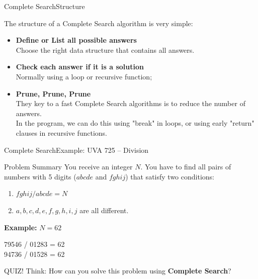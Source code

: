 \begin{frame}{Complete Search}{Structure}

  The structure of a Complete Search algorithm is very simple:
  \bigskip

  \begin{itemize}
    \item {\bf Define or List all possible answers}\\
    Choose the right data structure that contains all answers.
    \bigskip

  \item {\bf Check each answer if it is a solution}\\
    Normally using a loop or recursive function;
    \bigskip

  \item {\bf Prune, Prune, Prune}\\
    They key to a fast Complete Search algorithms is to reduce the number of answers.\\

    In the program, we can do this using "break" in loops, or using early "return" clauses in recursive functions.
  \end{itemize}

\end{frame}

\begin{frame}{Complete Search}{Example: UVA 725 -- Division}
  \begin{block}{Problem Summary}
    You receive an integer $N$. You have to find all pairs of numbers with 5 digits ($abcde$ and $fghij$) that satisfy two conditions:
    \begin{enumerate}
      \item $fghij / abcde = N$
      \item $a,b,c,d,e,f,g,h,i,j$ are all different.
    \end{enumerate}
  \end{block}\bigskip

  {\bf Example:} $N = 62$
  \medskip

  79546 / 01283 = 62\\
  94736 / 01528 = 62\\
  \bigskip

  \begin{alertblock}{QUIZ!}
    Think: How can you solve this problem using {\bf Complete Search}?
  \end{alertblock}
\end{frame}

